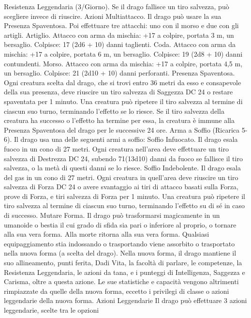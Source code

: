 \begin{multicols}{2}
Resistenza Leggendaria (3/Giorno). Se il drago fallisce un tiro
salvezza, può scegliere invece di riuscire.
Azioni
Multiattacco. Il drago può usare la sua Presenza Spaventosa. Poi
effettuare tre attacchi: uno con il morso e due con gli artigli.
Artiglio. Attacco con arma da mischia: +17 a colpire, portata 3
m, un bersaglio.
Colpisce: 17 (2d6 + 10) danni taglienti.
Coda. Attacco con arma da mischia: +17 a colpire, portata 6 m,
un bersaglio.
Colpisce: 19 (2d8 + 10) danni contundenti.
Morso. Attacco con arma da mischia: +17 a colpire, portata 4,5
m, un bersaglio.
Colpisce: 21 (2d10 + 10) danni perforanti.
Presenza Spaventosa. Ogni creatura scelta dal drago, che si trovi
entro 36 metri da esso e consapevole della sua presenza, deve
riuscire un tiro salvezza di Saggezza DC 24 o restare spaventata per
1 minuto. Una creatura può ripetere il tiro salvezza al termine di
ciascun suo turno, terminando l’effetto se lo riesce. Se il tiro salvezza
della creatura ha successo o l’effetto ha termine per essa, la creatura è
immune alla Presenza Spaventosa del drago per le successive 24 ore.
Arma a Soffio (Ricarica 5-6). Il drago usa una delle seguenti armi
a soffio:
Soffio Infuocato. Il drago esala fuoco in un cono di 27 metri. Ogni
creatura nell’area deve effettuare un tiro salvezza di Destrezza DC
24, subendo 71(13d10) danni da fuoco se fallisce il tiro salvezza, o la
metà di questi danni se lo riesce.
Soffio Indebolente. Il drago esala del gas in un cono di 27 metri. Ogni
creatura in quell’area deve riuscire un tiro salvezza di Forza DC 24 o
avere svantaggio ai tiri di attacco basati sulla Forza, prove di Forza, e
tiri salvezza di Forza per 1 minuto. Una creatura può ripetere il tiro
salvezza al termine di ciascun suo turno, terminando l’effetto su di sé
in caso di successo.
Mutare Forma. Il drago può trasformarsi magicamente in un
umanoide o bestia il cui grado di sfida sia pari o inferiore al proprio,
o tornare alla sua vera forma. Alla morte ritorna alla sua vera forma.
Qualsiasi equipaggiamento stia indossando o trasportando viene
assorbito o trasportato nella nuova forma (a scelta del drago).
Nella nuova forma, il drago mantiene il suo allineamento, punti
ferita, Dadi Vita, la facoltà di parlare, le competenze, la Resistenza
Leggendaria, le azioni da tana, e i punteggi di Intelligenza, Saggezza
e Carisma, oltre a questa azione. Le sue statistiche e capacità
vengono altrimenti rimpiazzate da quelle della nuova forma, eccetto i
privilegi di classe o azioni leggendarie della nuova forma.
Azioni Leggendarie
Il drago può effettuare 3 azioni leggendarie, scelte tra le opzioni

\end{multicols}
